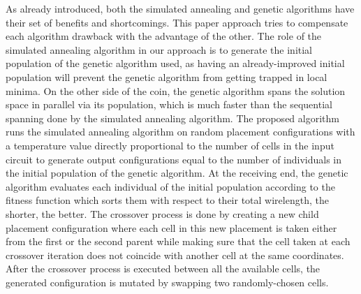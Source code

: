 \documentclass[conference]{IEEEtran}
\begin{document}
As already introduced, both the simulated annealing and genetic algorithms have their set of benefits and shortcomings. This paper approach tries to compensate each algorithm drawback with the advantage of the other. The role of the simulated annealing algorithm in our approach is to generate the initial population of the genetic algorithm used, as having an already-improved initial population will prevent the genetic algorithm from getting trapped in local minima. On the other side of the coin, the genetic algorithm spans the solution space in parallel via its population, which is much faster than the sequential spanning done by the simulated annealing algorithm. The proposed algorithm runs the simulated annealing algorithm on random placement configurations with a temperature value directly proportional to the number of cells in the input circuit to generate output configurations equal to the number of individuals in the initial population of the genetic algorithm. At the receiving end, the genetic algorithm evaluates each individual of the initial population according to the fitness function which sorts them with respect to their total wirelength, the shorter, the better. The crossover process is done by creating a new child placement configuration where each cell in this new placement is taken either from the first or the second parent while making sure that the cell taken at each crossover iteration does not coincide with another cell at the same coordinates. After the crossover process is executed between all the available cells, the generated configuration is mutated by swapping two randomly-chosen cells.
\end{document}
